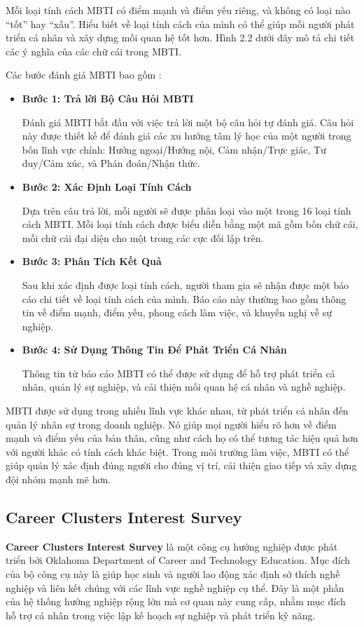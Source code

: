 Mỗi loại tính cách MBTI có điểm mạnh và điểm yếu riêng, và không có loại nào “tốt” hay “xấu”. Hiểu biết về loại tính cách của mình có thể giúp mỗi người phát triển cá nhân và xây dựng mối quan hệ tốt hơn. Hình 2.2 dưới đây mô tả chi tiết các ý nghĩa của các chữ cái trong MBTI.

\vspace{0.3cm}
Các bước đánh giá MBTI bao gồm : 
\begin{itemize}
    \item \textbf{Bước 1: Trả lời Bộ Câu Hỏi MBTI}
    
    Đánh giá MBTI bắt đầu với việc trả lời một bộ câu hỏi tự đánh giá. Câu hỏi này được thiết kế để đánh giá các xu hướng tâm lý học của một người trong bốn lĩnh vực chính: Hướng ngoại/Hướng nội, Cảm nhận/Trực giác, Tư duy/Cảm xúc, và Phán đoán/Nhận thức.
    \item \textbf{Bước 2: Xác Định Loại Tính Cách}
    
    Dựa trên câu trả lời, mỗi người sẽ được phân loại vào một trong 16 loại tính cách MBTI. Mỗi loại tính cách được biểu diễn bằng một mã gồm bốn chữ cái, mỗi chữ cái đại diện cho một trong các cực đối lập trên.
    \item \textbf{Bước 3: Phân Tích Kết Quả}
    
    Sau khi xác định được loại tính cách, người tham gia sẽ nhận được một báo cáo chi tiết về loại tính cách của mình. Báo cáo này thường bao gồm thông tin về điểm mạnh, điểm yếu, phong cách làm việc, và khuyến nghị về sự nghiệp.
    \item \textbf{Bước 4: Sử Dụng Thông Tin Để Phát Triển Cá Nhân}
    
    Thông tin từ báo cáo MBTI có thể được sử dụng để hỗ trợ phát triển cá nhân, quản lý sự nghiệp, và cải thiện mối quan hệ cá nhân và nghề nghiệp.
\end{itemize}

MBTI được sử dụng trong nhiều lĩnh vực khác nhau, từ phát triển cá nhân đến quản lý nhân sự trong doanh nghiệp. Nó giúp mọi người hiểu rõ hơn về điểm mạnh và điểm yếu của bản thân, cũng như cách họ có thể tương tác hiệu quả hơn với người khác có tính cách khác biệt. Trong môi trường làm việc, MBTI có thể giúp quản lý xác định đúng người cho đúng vị trí, cải thiện giao tiếp và xây dựng đội nhóm mạnh mẽ hơn.

\subsection{Career Clusters Interest Survey}\label{2.1.3}
\textbf{Career Clusters Interest Survey} là một công cụ hướng nghiệp được phát triển bởi Oklahoma Department of Career and Technology Education. Mục đích của bộ công cụ này là giúp học sinh và người lao động xác định sở thích nghề nghiệp và liên kết chúng với các lĩnh vực nghề nghiệp cụ thể. Đây là một phần của hệ thống hướng nghiệp rộng lớn mà cơ quan này cung cấp, nhằm mục đích hỗ trợ cá nhân trong việc lập kế hoạch sự nghiệp và phát triển kỹ năng.


